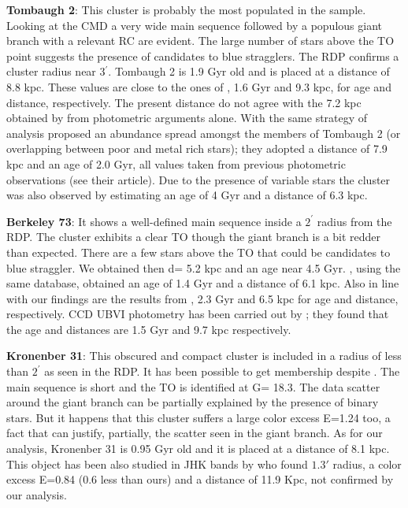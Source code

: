 \documentclass[draft]{aa}
\begin{document}
\textbf{Tombaugh 2}: 
This cluster is probably the most populated in the sample. Looking at the CMD a very wide main sequence followed by a populous giant branch with a relevant RC are evident. The large number of stars above the TO point suggests the presence of candidates to blue stragglers. The RDP confirms a cluster radius near 3$^{\prime}$. Tombaugh 2 is 1.9 Gyr old and is placed at a distance of 8.8 kpc. These values are close to the ones of \cite{Cantat_2020}, 1.6 Gyr and 9.3 kpc, for age and distance, respectively. The present distance do not agree with the 7.2 kpc obtained by \cite{2010A&A...509A.102V}  from photometric arguments alone. With the same strategy of analysis \cite{2008MNRAS.391...39F} proposed an abundance spread amongst the members of Tombaugh 2 (or overlapping between poor and metal rich stars); they adopted a distance of 7.9 kpc and an age of 2.0 Gyr, all values taken from previous photometric observations (see their article). Due to the presence of variable stars the cluster was also observed by \cite{1992AcA....42..155K} estimating an age of 4 Gyr and a distance of 6.3 kpc.

\textbf{Berkeley 73}:
It shows a well-defined main sequence inside a $2^{\prime}$ radius from the RDP. The cluster exhibits a clear TO though the giant branch is a bit redder than expected. There are a few stars above the TO that could be candidates to blue straggler. We obtained then d= 5.2 kpc and an age near 4.5 Gyr. \cite{Cantat_2020}, using the same database, obtained an age of 1.4 Gyr and a distance of 6.1 kpc. Also in line with our findings are the results from \cite{2005A&A...439.1135O}, 2.3 Gyr and 6.5 kpc for age and distance, respectively. CCD UBVI photometry has been carried out by \cite{2005A&A...442..917C}; they found that the age and distances are 1.5 Gyr and 9.7 kpc respectively. 

\textbf{Kronenber 31}:
This obscured and compact cluster is included in a radius of less than $2^{\prime}$ as seen in the RDP. It has been possible to get membership despite . The main sequence is short and the TO is identified at G= 18.3. The data scatter around the giant branch can be partially explained by the presence of binary stars. But it happens that this cluster suffers a large color excess E=1.24 too, a fact that can justify, partially, the scatter seen in the giant branch. As for our analysis, Kronenber 31 is 0.95 Gyr old and it is placed at a distance of 8.1 kpc. This object has been also studied in JHK bands by \cite{2006A&A...447..921K} who found $1.3{\prime}$ radius, a color excess E=0.84 (0.6 less than ours) and a distance of 11.9 Kpc, not confirmed by our analysis.
\end{document}
